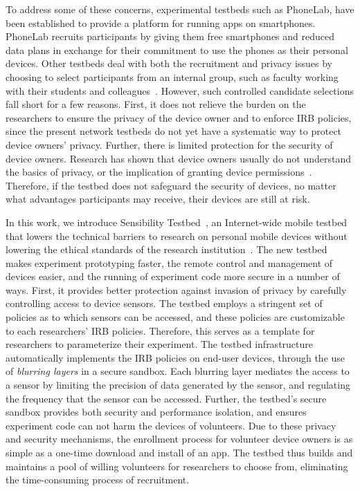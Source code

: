To address some of these concerns, experimental testbeds such as
PhoneLab, have
been established to provide a platform for running apps on
smartphones. PhoneLab recruits participants by giving them free
smartphones and reduced data plans in exchange for their commitment to
use the phones as their personal devices. 
Other testbeds deal with both
the recruitment and privacy issues by choosing to select participants
from an internal group, such as faculty working with their students
and colleagues~\cite{hao2013isleep, wang2012no, wang2013sensing}. However,
such controlled candidate selections fall short for a few reasons.
First, it does not relieve the burden on the researchers to ensure the privacy of the
device owner and to enforce IRB policies, since the present
network testbeds do not yet have a systematic way to protect device
owners' privacy. Further, there is limited protection for the security of device 
owners. Research has shown that device owners usually do not understand 
the basics of privacy, or the implication of granting device
permissions~\cite{camp2015respecting}. Therefore, if the testbed does 
not safeguard the security of devices, no matter what 
advantages participants may receive, their devices are still at risk.

In this work, we introduce Sensibility Testbed~\cite{sensibility,
zhuang2015privacy}, an Internet-wide mobile testbed that 
lowers the technical barriers to research on personal mobile
devices without lowering the ethical standards of the research
institution~\cite{zevenbergen2013ethical}.
The new testbed makes experiment prototyping faster, the remote
control and management of devices easier, and the running of
experiment code more secure in a number of ways. First, 
it provides better protection against invasion of privacy by carefully controlling
access to device sensors. The testbed employs a stringent set of
policies as to which sensors can be accessed, and these
policies are customizable to each researchers' IRB policies. Therefore,  
this serves as a template for researchers to parameterize their 
experiment. The testbed infrastructure automatically implements
the IRB policies on end-user devices, through the use of \textit{blurring 
layers} in a secure sandbox. Each blurring layer mediates the access to 
a sensor by limiting the precision of data generated by the sensor, and 
regulating the frequency that the sensor can be accessed. Further, 
the testbed's secure sandbox provides both security and performance 
isolation, and ensures experiment code can not harm the devices of 
volunteers. Due to these privacy and security mechanisms, 
the enrollment process for volunteer device owners is as
simple as a one-time download and install of an app. The testbed thus
builds and maintains a pool of willing volunteers for researchers to
choose from, eliminating the time-consuming process of recruitment.


